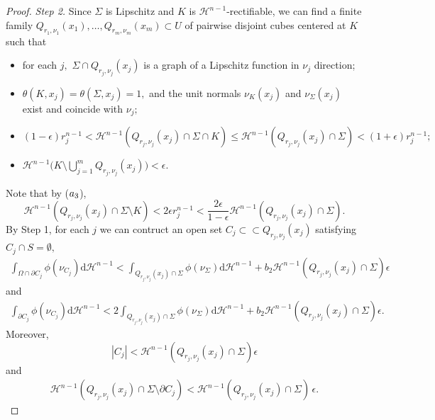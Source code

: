\documentclass[reqno]{amsart}
\numberwithin{equation}{section}
\theoremstyle{plain}
\theoremstyle{definition}
\newcommand{\cH}{\mathcal{H}}
\newcommand{\p}{\partial}
\newcommand{\bound}{b}
\renewcommand{\d}{\mathrm{d}}
\newcommand{\strictlyincluded}{\subset\subset}
\newcommand{\substrate}{S}
\begin{document}
\begin{proof}
{\it Step 2.} Since $\Sigma$ is Lipschitz and $K$ is $\cH^{n-1}$-rectifiable, we can find a finite  family $Q_{r_1,\nu_1}(x_1),\ldots, Q_{r_m,\nu_m}(x_m) \subset U$ of pairwise disjoint cubes centered at $K$ such that 
\begin{itemize}
 \item[($\rm a_1$)] for each $j,$ $\Sigma\cap Q_{r_j,\nu_j}(x_j)$ is a graph of a Lipschitz function in $\nu_j$ direction;

 \item[($\rm a_2$)] $\theta(K,x_j)=\theta(\Sigma,x_j)=1,$ and the unit normals $\nu_K(x_j)$ and $\nu_{\Sigma}(x_j)$ exist and coincide with $\nu_j;$
 
 \item[($\rm a_3$)] $(1-\epsilon)r_j^{n-1} <\cH^{n-1}(Q_{r_j,\nu_j}(x_j)\cap \Sigma\cap K)\le \cH^{n-1}(Q_{r_j,\nu_j}(x_j)\cap \Sigma)<(1+\epsilon)r_j^{n-1};$
 
 \item[($\rm a_4$)] $\cH^{n-1}\Big(K\setminus \bigcup_{j=1}^m Q_{r_j,\nu_j}(x_j)\Big)<\epsilon.$
\end{itemize}

Note that by ($\rm a_3$),
\begin{equation}\label{K_out_sigma89}
\cH^{n-1}(Q_{r_j,\nu_j}(x_j)\cap \Sigma\setminus K) <2\epsilon r_j^{n-1} < \frac{2\epsilon}{1-\epsilon} \cH^{n-1}(Q_{r_j,\nu_j}(x_j)\cap \Sigma). 
\end{equation}
%
By Step 1, for each $j$ we can contruct an open set $C_j\strictlyincluded Q_{r_j,\nu_j}(x_j)$ satisfying $C_j\cap\substrate =\emptyset,$
\begin{align}\label{est_Cjjjj9099}
\int_{\Omega\cap \p C_j} \phi(\nu_{C_j})\d\cH^{n-1} < \int_{Q_{r_j,\nu_j}(x_j)\cap\Sigma}\phi(\nu_\Sigma)\d\cH^{n-1} + \bound_2\cH^{n-1}(Q_{r_j,\nu_j}(x_j)\cap\Sigma)\epsilon 
\end{align}
and 
\begin{align*} 
\int_{\p C_j} \phi(\nu_{C_j})\d\cH^{n-1} < 2 \int_{Q_{r_j,\nu_j}(x_j)\cap\Sigma}\phi(\nu_\Sigma)\d\cH^{n-1} + \bound_2\cH^{n-1}(Q_{r_j,\nu_j}(x_j)\cap\Sigma)\epsilon.
\end{align*}
Moreover,
\begin{equation}\label{vol_estCjjjj}
|C_j| < \cH^{n-1}(Q_{r_j,\nu_j}(x_j)\cap\Sigma)\epsilon  
\end{equation}
%
and
%
\begin{align}\label{out_jshsh00}
\cH^{n-1}(Q_{r_j,\nu_j}(x_j)\cap\Sigma\setminus \p C_j) < \cH^{n-1}(Q_{r_j,\nu_j}(x_j)\cap\Sigma)\,\epsilon.
\end{align}



\end{proof}
\end{document}
